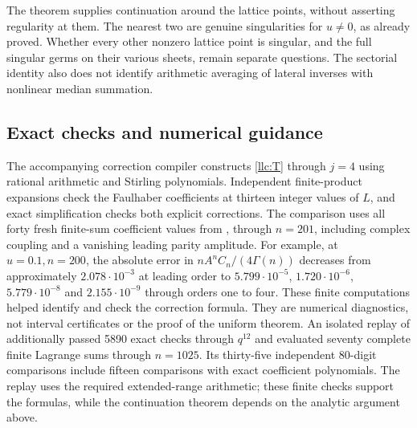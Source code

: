 The theorem supplies continuation around the lattice points, without
asserting regularity at them. The nearest two are genuine singularities
for $u\ne0$, as already proved. Whether every other nonzero lattice
point is singular, and the full singular germs on their various sheets,
remain separate questions. The sectorial identity also does not identify
arithmetic averaging of lateral inverses with nonlinear median summation.

\subsection{Exact checks and numerical guidance}

The accompanying correction compiler constructs \eqref{llc:T} through
$j=4$ using rational arithmetic and Stirling polynomials. Independent
finite-product expansions check the Faulhaber coefficients at thirteen
integer values of $L$, and exact simplification checks both explicit
corrections. The comparison uses all forty fresh finite-sum coefficient
values from \cite{llc:reversion}, through $n=201$, including complex
coupling and a vanishing leading parity amplitude. For example, at
$u=0.1,n=200$, the absolute error in $nA^nC_n/(4\Gamma(n))$ decreases
from approximately $2.078\cdot10^{-3}$ at leading order to
$5.799\cdot10^{-5}$, $1.720\cdot10^{-6}$,
$5.779\cdot10^{-8}$ and $2.155\cdot10^{-9}$ through orders one to four.
These finite computations helped identify and check the correction
formula. They are numerical diagnostics, not interval certificates or
the proof of the uniform theorem.
An isolated replay of \cite{llc:continuation} additionally passed 5890
exact checks through $q^{12}$ and evaluated seventy complete finite
Lagrange sums through $n=1025$. Its thirty-five independent 80-digit
comparisons include fifteen comparisons with exact coefficient
polynomials. The replay uses the required extended-range arithmetic;
these finite checks support the formulas, while the continuation theorem
depends on the analytic argument above.
